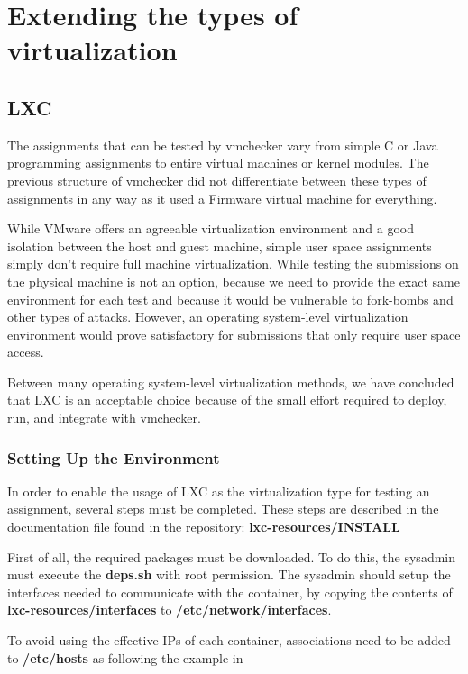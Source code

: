 \chapter{Extending the types of virtualization}
\label{chapter:virt-types}

\section{LXC}
\label{sec:vmc-lxc}

The assignments that can be tested by vmchecker vary from simple C or Java
programming assignments to entire virtual machines or kernel modules.
The previous structure of vmchecker did not differentiate between these types of
assignments in any way as it used a Firmware virtual machine for everything.

While VMware offers an agreeable virtualization environment and a good isolation
between the host and guest machine, simple user space assignments simply don't 
require full machine virtualization. While testing the submissions on the 
physical machine is not an option, because we need to provide the exact same
environment for each test and because it would be vulnerable to fork-bombs and 
other types of attacks. However, an operating system-level virtualization 
environment would prove satisfactory for submissions that only require user space
access.

Between many operating system-level virtualization methods, we have concluded
that LXC is an acceptable choice because of the small effort required to 
deploy, run, and integrate with vmchecker.


\subsection {Setting Up the Environment}
\label{sub-sec:vmc-lxc-env}

In order to enable the usage of LXC as the virtualization type for testing an 
assignment, several steps must be completed. These steps are described in the 
documentation file found in the repository: \textbf{lxc-resources/INSTALL}

First of all, the required packages must be downloaded. To do this, the sysadmin
must  execute the \textbf{deps.sh} with root permission. The sysadmin should
setup the interfaces needed to communicate with the container, by copying the
contents of \textbf{lxc-resources/interfaces} to \textbf{/etc/network/interfaces}.

To avoid using the effective IPs of each container, associations need to be 
added to \textbf{/etc/hosts} as following the example in 


